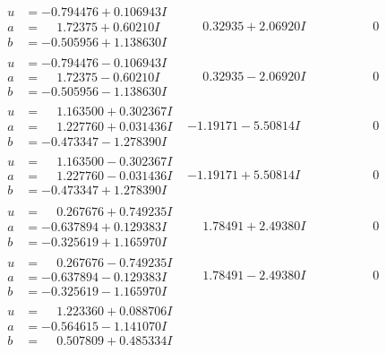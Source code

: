 \documentclass[1p]{elsarticle_modified}
\theoremstyle{definition}
\begin{document}
$$\begin{array}{c|c|c}
\begin{aligned}
u &= -0.794476 + 0.106943 I \\
a &= \phantom{-}1.72375 + 0.60210 I \\
b &= -0.505956 + 1.138630 I\end{aligned}
 & \phantom{-}0.32935 + 2.06920 I & \phantom{-0.000000 } 0 \\ \hline\begin{aligned}
u &= -0.794476 - 0.106943 I \\
a &= \phantom{-}1.72375 - 0.60210 I \\
b &= -0.505956 - 1.138630 I\end{aligned}
 & \phantom{-}0.32935 - 2.06920 I & \phantom{-0.000000 } 0 \\ \hline\begin{aligned}
u &= \phantom{-}1.163500 + 0.302367 I \\
a &= \phantom{-}1.227760 + 0.031436 I \\
b &= -0.473347 - 1.278390 I\end{aligned}
 & -1.19171 - 5.50814 I & \phantom{-0.000000 } 0 \\ \hline\begin{aligned}
u &= \phantom{-}1.163500 - 0.302367 I \\
a &= \phantom{-}1.227760 - 0.031436 I \\
b &= -0.473347 + 1.278390 I\end{aligned}
 & -1.19171 + 5.50814 I & \phantom{-0.000000 } 0 \\ \hline\begin{aligned}
u &= \phantom{-}0.267676 + 0.749235 I \\
a &= -0.637894 + 0.129383 I \\
b &= -0.325619 + 1.165970 I\end{aligned}
 & \phantom{-}1.78491 + 2.49380 I & \phantom{-0.000000 } 0 \\ \hline\begin{aligned}
u &= \phantom{-}0.267676 - 0.749235 I \\
a &= -0.637894 - 0.129383 I \\
b &= -0.325619 - 1.165970 I\end{aligned}
 & \phantom{-}1.78491 - 2.49380 I & \phantom{-0.000000 } 0 \\ \hline\begin{aligned}
u &= \phantom{-}1.223360 + 0.088706 I \\
a &= -0.564615 - 1.141070 I \\
b &= \phantom{-}0.507809 + 0.485334 I\end{aligned}

\end{array}$$
\end{document}
